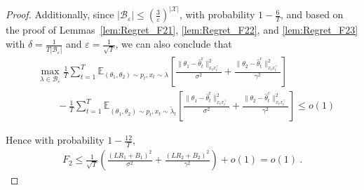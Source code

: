 \documentclass[accepted]{uai2025} %
\theoremstyle{plain}
\theoremstyle{definition}
\theoremstyle{remark}
\begin{document}
\begin{proof}
Additionally, since \( |\mathcal{B}_\varepsilon| \le \left( \frac{3}{\varepsilon} \right)^{|\mathcal{X}|} \), with probability \( 1 - \frac{6}{T} \), and based on the proof of Lemmas~\ref{lem:Regret_F21}, \ref{lem:Regret_F22}, and \ref{lem:Regret_F23} with \( \delta = \frac{1}{T|\mathcal{B}_\varepsilon|} \) and \( \varepsilon = \frac{1}{\sqrt{T}} \), we can also conclude that
\begin{align*}
&\max_{\lambda \in \mathcal{B}_\varepsilon} \frac{1}{T} \sum_{t=1}^{T} \mathbb{E}_{(\theta_1, \theta_2) \sim p_t, x_t \sim \lambda} \left[ \frac{\|\theta_1 - \hat{\theta}_t^{\mathrm{r}}\|_{x_t x_t^\top}^2}{\sigma^2} + \frac{\|\theta_2 - \hat{\theta}_t^{\mathrm{c}}\|_{x_t x_t^\top}^2}{\gamma^2} \right] \\
&\qquad- \frac{1}{T} \sum_{t=1}^{T} \mathbb{E}_{(\theta_1, \theta_2) \sim p_t, x_t \sim \tilde{\lambda}_t} \left[ \frac{\|\theta_1 - \hat{\theta}_t^{\mathrm{r}}\|_{x_t x_t^\top}^2}{\sigma^2} + \frac{\|\theta_2 - \hat{\theta}_t^{\mathrm{c}}\|_{x_t x_t^\top}^2}{\gamma^2} \right]
\le o(1)
\end{align*}

Hence with probability $1-\frac{12}{T}$,
\begin{align*}
    F_2\le \frac{1}{\sqrt{T}}\left(\frac{(LR_1+B_1)^2}{\sigma^2}+\frac{(LR_2+B_2)^2}{\gamma^2}\right)+o(1)
    =o(1)~.
\end{align*}



\end{proof}
\end{document}
